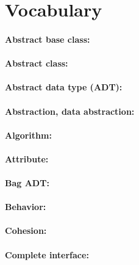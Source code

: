 
\newcommand{\laClass}       {CS 250}
\newcommand{\laSemester}    {Spring 2018}
\newcommand{\laChapter}     {}
\newcommand{\laType}        {Notes for}
\newcommand{\laAssignment}  {Chapter 1}
\newcommand{\laPoints}      {5}
\newcommand{\laTitle}       {Data Abstraction}
\newcommand{\laTopics}      {Stuff, stuff, and stuff.}
\setcounter{chapter}{1}
\setcounter{section}{1}
\addtocounter{section}{-1}
\toggletrue{answerkey}
\togglefalse{answerkey}


    \section*{Vocabulary}

        \paragraph{   Abstract base class: }
        \paragraph{   Abstract class: }
        \paragraph{   Abstract data type (ADT): }
        \paragraph{   Abstraction, data abstraction: }
        \paragraph{   Algorithm: }
        \paragraph{   Attribute: }
        \paragraph{   Bag ADT: }
        \paragraph{   Behavior: }
        \paragraph{   Cohesion: }
        \paragraph{   Complete interface: }
